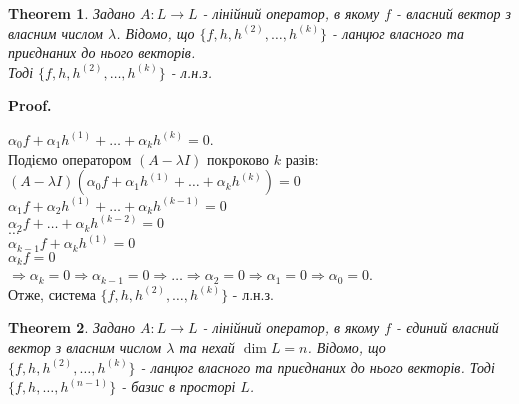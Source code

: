\documentclass[a4paper, 10pt]{article}
\makeatletter
\def\qed{$\blacksquare$}
\theoremstyle{theoremdd}
\newtheorem{theorem}{Theorem}[subsection]
\theoremstyle{theoremdd}
\theoremstyle{theoremdd}
\theoremstyle{theoremdd}
\theoremstyle{theoremdd}
\theoremstyle{theoremdd}
\theoremstyle{theoremdd}
\theoremstyle{theoremdd}
\renewenvironment{proof}[1][Proof.\\]{\par
\pushQED{\hfill \qed}%
\normalfont \topsep6\p@\@plus6\p@\relax
\trivlist
\item\relax
{\bfseries
#1\@addpunct{.}}\hspace\labelsep\ignorespaces
}{%
\popQED\endtrivlist\@endpefalse
}
\makeatother
\begin{document}
\begin{theorem}
Задано $A: L \to L$ - лінійний оператор, в якому $f$ - власний вектор з власним числом $\lambda$. Відомо, що $\{f,h,h^{(2)},\dots,h^{(k)}\}$ - ланцюг власного та приєднаних до нього векторів.\\
Тоді $\{f,h,h^{(2)},\dots,h^{(k)}\}$ - л.н.з.
\end{theorem}

\begin{proof}
$\alpha_0 f + \alpha_1 h^{(1)} + \dots + \alpha_k h^{(k)} = 0$.\\
Подіємо оператором $(A-\lambda I)$ покроково $k$ разів:\\
$(A-\lambda I)(\alpha_0 f + \alpha_1 h^{(1)} + \dots + \alpha_k h^{(k)}) = 0$\\
$\alpha_1 f + \alpha_2 h^{(1)} + \dots + \alpha_k h^{(k-1)} = 0$\\
$\alpha_2 f + \dots + \alpha_k h^{(k-2)} = 0$\\
$\dots$\\
$\alpha_{k-1} f + \alpha_k h^{(1)} = 0$\\
$\alpha_k f = 0$\\
$\Rightarrow \alpha_k = 0 \Rightarrow \alpha_{k-1} = 0 \Rightarrow \dots \Rightarrow \alpha_2 = 0 \Rightarrow \alpha_1 = 0 \Rightarrow \alpha_0 = 0$.\\
Отже, система $\{f,h,h^{(2)},\dots,h^{(k)}\}$ - л.н.з.
\end{proof}

\begin{theorem}
Задано $A: L \to L$ - лінійний оператор, в якому $f$ - єдиний власний вектор з власним числом $\lambda$ та нехай $\dim L = n$. Відомо, що $\{f,h,h^{(2)},\dots,h^{(k)}\}$ - ланцюг власного та приєднаних до нього векторів.
Тоді $\{f,h,\dots,h^{(n-1)}\}$ - базис в просторі $L$.
\end{theorem}
\end{document}
